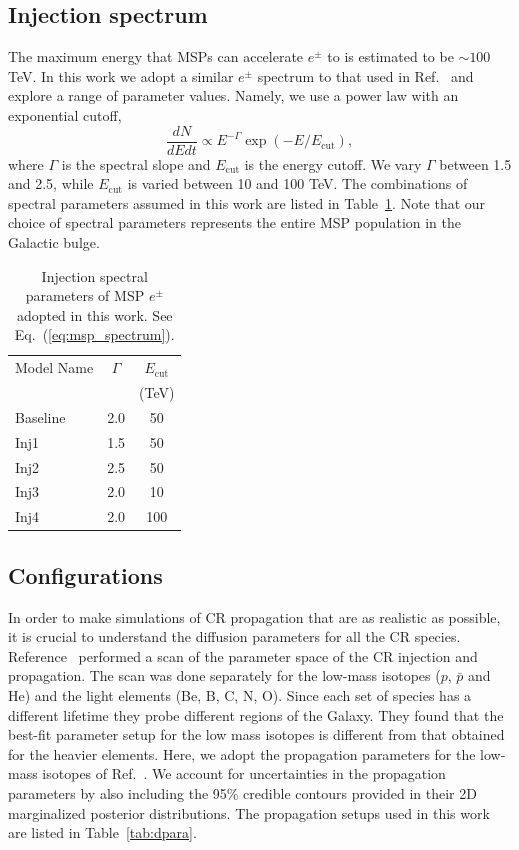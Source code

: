 \documentclass[doublespace,nopageskip]{VTthesis} %
\begin{document}
\subsection{Injection spectrum}\label{sec:spectrum}

The maximum energy that MSPs can accelerate $e^{\pm}$ to is estimated to be $\sim 100$ TeV. In this work we adopt a similar $e^\pm$ spectrum to that used in Ref.~\cite{2015ApJ...802..124Y} and explore a range of parameter values. Namely, we use a power law with an exponential cutoff,
\begin{equation}
  \label{eq:msp_spectrum}
  \dfrac{dN}{dEdt} \propto E^{-\Gamma}\exp(-E/E_{\text{cut}}),
\end{equation}
where $\Gamma$ is the spectral slope and $E_{\text{cut}}$ is the energy cutoff. We vary $\Gamma$ between 1.5 and 2.5, while $E_{\text{cut}}$ is varied between 10 and 100 TeV. The combinations of spectral parameters assumed in this work are listed in Table~\ref{tab:msp_spectrum}. Note that our choice of spectral parameters represents the entire MSP population in the Galactic bulge.
\begin{table}[htb]
  \centering
  \caption{Injection spectral parameters of MSP $e^{\pm}$ adopted in this work. See Eq.~(\ref{eq:msp_spectrum}).}
    \begin{tabular}{lcc}
    \toprule
    Model Name&$\Gamma$ & $E_{\text{cut}}$\\
    & &  (TeV) \\
    \midrule
    Baseline &2.0 & 50 \\
    Inj1&1.5 & 50 \\
    Inj2&2.5 & 50 \\
    Inj3&2.0 & 10 \\
    Inj4&2.0 & 100\\
    \bottomrule
    \end{tabular}
  \label{tab:msp_spectrum}
\end{table}

\subsection{Configurations}

In order to make simulations of CR propagation that are as realistic as possible, it is crucial to understand the diffusion parameters for all the CR species. Reference~\cite{2016ApJ...824...16J} performed a scan of the parameter space of the CR injection and propagation. The scan was done separately for the low-mass isotopes ($p$, $\bar{p}$ and He) and the light elements (Be, B, C, N, O). Since each set of species has a different lifetime they probe different regions of the Galaxy. They found that the best-fit parameter setup for the low mass isotopes is different from that obtained for the heavier elements. Here, we adopt the propagation parameters for the low-mass isotopes of Ref.~\cite{2016ApJ...824...16J}. We account for uncertainties in the propagation parameters by also including the 95\% credible contours provided in their 2D marginalized posterior distributions. The propagation setups used in this work are listed in Table~\ref{tab:dpara}.
\end{document}
